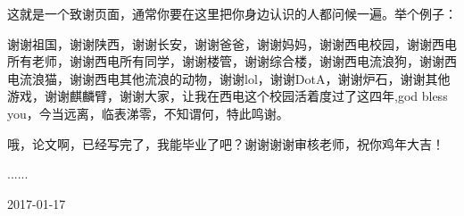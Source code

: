 
\begin{thanks}

这就是一个致谢页面，通常你要在这里把你身边认识的人都问候一遍。举个例子：

谢谢祖国，谢谢陕西，谢谢长安，谢谢爸爸，谢谢妈妈，谢谢西电校园，谢谢西电所有老师，谢谢西电所有同学，谢谢楼管，谢谢综合楼，谢谢西电流浪狗，谢谢西电流浪猫，谢谢西电其他流浪的动物，谢谢lol，谢谢DotA，谢谢炉石，谢谢其他游戏，谢谢麒麟臂，谢谢大家，让我在西电这个校园活着度过了这四年,god bless you，今当远离，临表涕零，不知谓何，特此鸣谢。

哦，论文啊，已经写完了，我能毕业了吧？谢谢谢谢审核老师，祝你鸡年大吉！

......

\vskip 18pt

2017-01-17

\end{thanks}

\cleardoublepage
